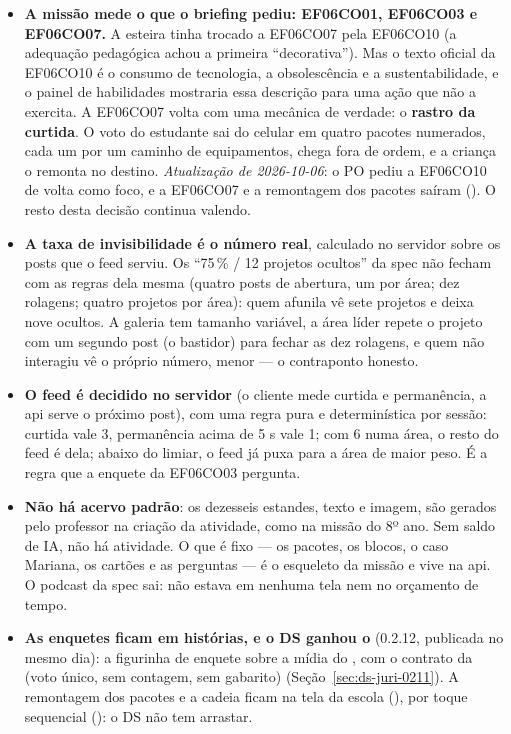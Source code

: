 \begin{itemize}
  \item \textbf{A missão mede o que o briefing pediu: EF06CO01, EF06CO03 e
    EF06CO07.} A esteira tinha trocado a EF06CO07 pela EF06CO10 (a adequação
    pedagógica achou a primeira ``decorativa''). Mas o texto oficial da
    EF06CO10 é o consumo de tecnologia, a obsolescência e a sustentabilidade, e
    o painel de habilidades mostraria essa descrição para uma ação que não a
    exercita. A EF06CO07 volta com uma mecânica de verdade: o \textbf{rastro da
    curtida}. O voto do estudante sai do celular em quatro pacotes numerados,
    cada um por um caminho de equipamentos, chega fora de ordem, e a criança o
    remonta no destino.
    \emph{Atualização de 2026-10-06}: o PO pediu a EF06CO10 de volta como
    foco, e a EF06CO07 e a remontagem dos pacotes saíram
    (). O resto desta decisão continua valendo.
  \item \textbf{A taxa de invisibilidade é o número real}, calculado no
    servidor sobre os posts que o feed serviu. Os ``75\,\% / 12 projetos
    ocultos'' da spec não fecham com as regras dela mesma (quatro posts de
    abertura, um por área; dez rolagens; quatro projetos por área): quem
    afunila vê sete projetos e deixa nove ocultos. A galeria tem tamanho
    variável, a área líder repete o projeto com um segundo post (o bastidor)
    para fechar as dez rolagens, e quem não interagiu vê o próprio número,
    menor --- o contraponto honesto.
  \item \textbf{O feed é decidido no servidor} (o cliente mede curtida e
    permanência, a api serve o próximo post), com uma regra pura e
    determinística por sessão: curtida vale 3, permanência acima de 5 s vale
    1; com 6 numa área, o resto do feed é dela; abaixo do limiar, o feed já
    puxa para a área de maior peso. É a regra que a enquete da EF06CO03
    pergunta.
  \item \textbf{Não há acervo padrão}: os dezesseis estandes, texto e imagem,
    são gerados pelo professor na criação da atividade, como na missão do 8º
    ano. Sem saldo de IA, não há atividade. O que é fixo --- os pacotes, os
    blocos, o caso Mariana, os cartões e as perguntas --- é o esqueleto da
    missão e vive na api. O podcast da spec sai: não estava em nenhuma tela nem
    no orçamento de tempo.
  \item \textbf{As enquetes ficam em histórias, e o DS ganhou o
    } (0.2.12, publicada no mesmo dia): a figurinha de enquete
    sobre a mídia do , com o contrato da  (voto
    único, sem contagem, sem gabarito) (Seção~\ref{sec:ds-juri-0211}). A remontagem dos pacotes e a cadeia ficam na tela da escola
    (), por toque sequencial (): o DS não tem
    arrastar.
\end{itemize}

